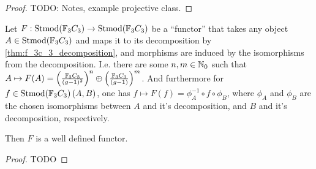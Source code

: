 \begin{theorem}
\begin{enumerate}
{\begin{center}
            \end{center}
        }
    \end{enumerate}
\end{theorem}
\begin{proof}
    TODO: Notes, example projective class.
\end{proof}





\begin{theorem} \label{thm:F_functor}
    Let \( F: \operatorname{Stmod}({\mathbb{F}}_3C_3) \to \operatorname{Stmod}({\mathbb{F}}_3C_3) \) be a ``functor'' that takes any object \( A \in \operatorname{Stmod}({\mathbb{F}}_3C_3) \) and maps it to its decomposition by \autoref{thm:f_3c_3_decomposition}, and morphisms are induced by the isomorphisms from the decomposition. I.e. there are some \( n, m \in {\mathbb{N}}_0 \) such that \( A \mapsto F(A) = \left( \frac{{\mathbb{F}}_3C_3}{(g - 1)^2} \right)^n \oplus \left( \frac{{\mathbb{F}}_3C_3}{(g - 1)} \right)^m \). And furthermore for \( f \in \operatorname{Stmod}({\mathbb{F}}_3C_3)\left(A, B\right) \), one has \( f \mapsto F(f) = \phi_A^{-1} \circ f \circ \phi_B \), where \( \phi_A \) and \( \phi_B \) are the chosen isomorphisms between \( A \) and it's decomposition, and \( B \) and it's decomposition, respectively.

    Then \( F \) is a well defined functor.
\end{theorem}
\begin{proof}
    TODO
\end{proof}


